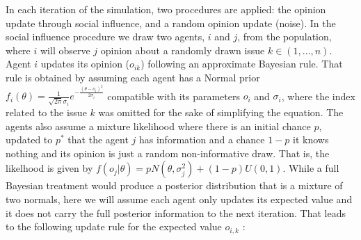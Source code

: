 \documentclass{article}
\begin{document}


In each iteration of the simulation, two procedures are applied: the
opinion update through social influence, and a random opinion update (noise). In
the social influence procedure we draw two agents, \(i\) and \(j\), from the
population, where \(i\) will observe \(j\) opinion about a randomly drawn issue \(k
\in (1 , \ldots, n)\). %
Agent \(i\)
updates its opinion (\(o_{ik}\)) following an approximate Bayesian rule. That rule is obtained by assuming each agent has a
Normal prior \(f_i(\theta) = \frac{1}{\sqrt{2 \pi} \sigma_i} e^{- \frac{(\theta
- o_i )^2}{2 \sigma_i}} \) compatible with its parameters $o_{i}$ and $\sigma_{i}$, where the index related to the issue $k$ was omitted for the sake of simplifying the equation.  The agents also assume a mixture likelihood where there is an initial chance
\(p\), updated to \(p^*\) that the agent \(j\) has information and a chance
\(1-p\) it knows nothing and its opinion is just a random non-informative draw. That is, the likelhood is given by
 \( f(o_j|\theta) = p N(\theta,\sigma_j^2) + (1-p)U(0,1) \). While a full Bayesian treatment would produce a posterior distribution that is a mixture of two normals, here we will assume each agent only updates its expected value and it does not carry the full posterior information to the next iteration. That leads to the following update rule for the expected value $o_{i,k}$ \cite{martins12b}:
\end{document}
